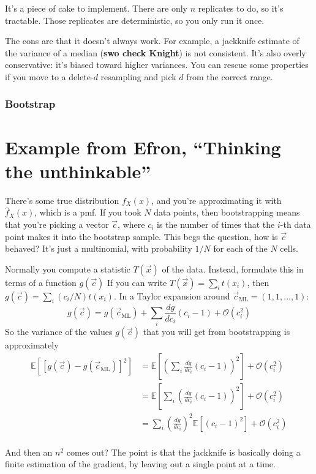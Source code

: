 \documentclass{book}
\newcommand{\expect}[1]{\mathbb{E}\!\left[{#1}\right]}
\begin{document}
It's a piece of cake to implement. There are only \(n\) replicates to
do, so it's tractable. Those replicates are deterministic, so you only
run it once.

The cons are that it doesn't always work. For example, a jackknife
estimate of the variance of a median (\textbf{swo check Knight}) is not
consistent. It's also overly conservative: it's biased toward higher
variances. You can rescue some properties if you move to a delete-\(d\)
resampling and pick \(d\) from the correct range.

\subsubsection{Bootstrap}\label{bootstrap}

\section{Example from Efron, ``Thinking the unthinkable''}

There's some true distribution $f_X(x)$, and you're approximating it with
$\hat{f}_X(x)$, which is a pmf. If you took $N$ data points, then bootstrapping
means that you're picking a vector $\vec{c}$, where $c_i$ is the number of
times that the $i$-th data point makes it into the bootstrap sample. This
begs the question, how is $\vec{c}$ behaved? It's just a multinomial, with
probability $1/N$ for each of the $N$ cells.

Normally you compute a statistic $T(\vec{x})$ of the data. Instead, formulate
this in terms of a function $g(\vec{c})$ If you can write $T(\vec{x}) = \sum_i t(x_i)$,
then $g(\vec{c}) = \sum_i (c_i/N) t(x_i)$. In a Taylor expansion around
$\vec{c}_\mathrm{ML} = (1, 1, \ldots, 1)$:
$$
g(\vec{c}) = g(\vec{c}_\mathrm{ML}) + \sum_i \frac{dg}{dc_i} (c_i - 1) + \mathcal{O}(c_i^2)
$$
So the variance of the values $g(\vec{c})$ that you will get from
bootstrapping is approximately
\begin{align}
\expect{\left[g(\vec{c}) - g(\vec{c}_\mathrm{ML})\right]^2}
  &= \expect{\left(\sum_i \frac{dg}{dc_i} (c_i-1)\right)^2} + \mathcal{O}(c_i^2) \\
  &= \expect{\sum_i \left( \frac{dg}{dc_i} (c_i-1)\right)^2} + \mathcal{O}(c_i^2) \\
  &= \sum_i \left(\frac{dg}{dc_i}\right)^2 \expect{(c_i-1)^2} + \mathcal{O}(c_i^2) \\
\end{align}

And then an $n^2$ comes out? The point is that the jackknife is basically
doing a finite estimation of the gradient, by leaving out a single point at a
time.
\end{document}

